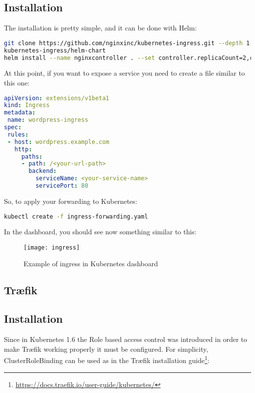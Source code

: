 \subsection{Installation}
\label{installation}

The installation is pretty simple, and it can be done with Helm:
\begin{lstlisting}[language=bash]
git clone https://github.com/nginxinc/kubernetes-ingress.git --depth 1 # Clone the project repository
kubernetes-ingress/helm-chart
helm install --name nginxcontroller . --set controller.replicaCount=2,controller.service.type=NodePort,controller.service.externalTrafficPolicy=Cluster # Install the helm package
\end{lstlisting}

At this point, if you want to expose a service you need to create a file
similar to this one:
\begin{lstlisting}[language=yaml]
apiVersion: extensions/v1beta1
kind: Ingress
metadata:
 name: wordpress-ingress
spec:
 rules:
 - host: wordpress.example.com
   http:
     paths:
     - path: /<your-url-path>
       backend:
         serviceName: <your-service-name>
         servicePort: 80
\end{lstlisting}

So, to apply your forwarding to Kubernetes:
\begin{lstlisting}[language=bash]
kubectl create -f ingress-forwarding.yaml
\end{lstlisting}

In the dashboard, you should see now something similar to this:
\begin{figure}[htbp]
\centering
\texttt{[image: ingress]}
\caption{Example of ingress in Kubernetes dashboard}
\end{figure}

\subsection{Træfik}
\label{truxe6fik}

\subsection{Installation}
\label{installation-1}
Since in Kubernetes 1.6 the Role based access control was introduced in order to 
make Træfik working properly it must be configured. For simplicity, 
ClusterRoleBinding can be used as in the Træfik installation guide\footnote{
\url{https://docs.traefik.io/user-guide/kubernetes/}}:

